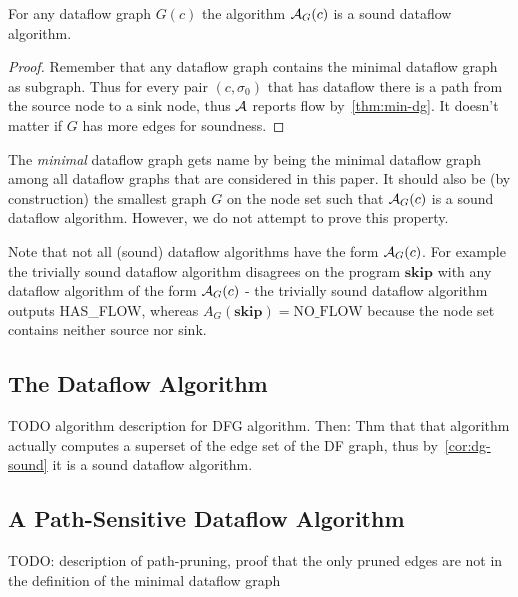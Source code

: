 \begin{corollary}
    \label{cor:dg-sound}
    For any dataflow graph $G(c)$ the algorithm $\operatorname{\mathcal{A}}_{G}(c)$ is a sound
     dataflow algorithm.
\end{corollary}
\begin{proof}
    Remember that any dataflow graph contains the minimal dataflow graph as 
    subgraph. Thus for every pair $(c, \sigma_0)$ that has dataflow
    there is a path from the source node to a sink node, 
    thus $\operatorname{\mathcal{A}}$ reports flow by~\autoref{thm:min-dg}.
    It doesn't matter if $G$ has more edges for soundness.
\end{proof}

\begin{remark}
    The \emph{minimal} dataflow graph gets name by being the minimal dataflow graph
    among all dataflow graphs that are considered in this paper.
    It should also be (by construction) the smallest graph $G$ on the node set 
    such that $\operatorname{\mathcal{A}}_G(c)$ is a sound dataflow algorithm.
    However, we do not attempt to prove this property.
\end{remark}

\begin{remark}
    Note that not all (sound) dataflow algorithms have the form $\operatorname{\mathcal{A}}_G(c)$.
    For example the trivially sound dataflow algorithm disagrees on the 
    program $\textbf{skip}$ with any dataflow algorithm of the form 
    $\operatorname{\mathcal{A}}_G(c)$ - the trivially sound
    dataflow algorithm outputs HAS\_FLOW, whereas
    $A_G(\textbf{skip}) = \text{NO\_FLOW}$ because the node set contains
    neither source nor sink.
\end{remark}

\subsection{The Dataflow Algorithm}
TODO algorithm description for DFG algorithm.
Then: Thm that that algorithm actually computes a superset of the edge set of 
the DF graph, thus by~\autoref{cor:dg-sound} it is a sound dataflow algorithm.


\subsection{A Path-Sensitive Dataflow Algorithm}
TODO: description of path-pruning, proof that the only pruned edges are not
in the definition of the minimal dataflow graph

